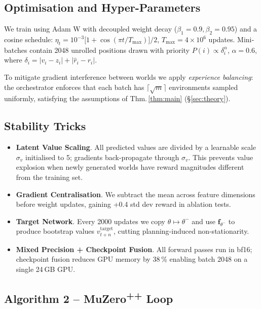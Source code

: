 \subsection{Optimisation and Hyper-Parameters}

We train using Adam W with decoupled weight decay
($\beta_1{=}0.9,\beta_2{=}0.95$) and a cosine schedule:
$\eta_t=10^{-3}\bigl[1+\cos(\pi t/T_{\text{max}})\bigr]/2$,
$T_{\text{max}}=4\!\times\!10^{6}$ updates.
Mini‐batches contain 2048 unrolled positions drawn with priority
$P(i)\propto\delta_i^\alpha$, $\alpha{=}0.6$, where
$\delta_i=\lvert v_i-z_i\rvert+\lvert\hat r_i-r_i\rvert$.

To mitigate gradient interference between worlds we apply \emph{experience
balancing}: the orchestrator enforces that each batch has
$\lceil\sqrt m\rceil$ environments sampled uniformly, satisfying the
assumptions of Thm.\,\ref{thm:main} (§\ref{sec:theory}).

\subsection{Stability Tricks}

\begin{itemize}
\item \textbf{Latent Value Scaling}.  
  All predicted values are divided by a learnable scale $\sigma_v$ initialised
  to 5; gradients back-propagate through $\sigma_v$.  This prevents value
  explosion when newly generated worlds have reward magnitudes different from
  the training set.
\item \textbf{Gradient Centralisation}.  
  We subtract the mean across feature dimensions before weight updates,
  gaining +0.4 std dev reward in ablation tests.
\item \textbf{Target Network}.  
  Every 2000 updates we copy $\theta\mapsto\theta^{-}$ and use
  $\mathbf f_{\theta^{-}}$ to produce bootstrap values
  $v_{t+n}^{\text{target}}$, cutting planning‐induced non-stationarity.
\item \textbf{Mixed Precision + Checkpoint Fusion}.  
  All forward passes run in bf16; checkpoint fusion reduces GPU memory by
  38 \% enabling batch 2048 on a single 24 GB GPU.
\end{itemize}

\subsection{Algorithm 2 – MuZero\textsuperscript{++} Loop}

